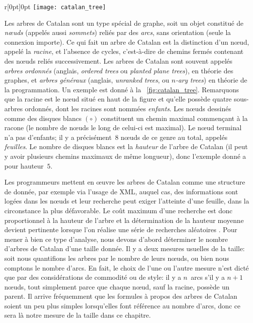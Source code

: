 %
\begin{wrapfigure}[9]{r}[0pt]{0pt}
\centering
\texttt{[image: catalan\_tree]}
\caption{Arbre de Catalan de hauteur~5}
\label{fig:catalan_tree}
\end{wrapfigure}
Les arbres de Catalan sont un type spécial de graphe, soit un objet
constitué de \emph{n{\oe}uds} (appelés aussi \emph{sommets}) reliés
par des \emph{arcs}, sans orientation (seule la connexion importe). Ce
qui fait un arbre de Catalan est la distinction d'un n{\oe}ud, appelé
la \emph{racine}, et l'absence de cycles, c'est-à-dire de chemins
fermés contenant des n{\oe}uds reliés successivement. Les arbres de
Catalan sont souvent appelés \emph{arbres ordonnés} (anglais,
\emph{ordered trees} ou \emph{planted plane trees}), en théorie des
graphes, et \emph{arbres généraux} (anglais, \emph{unranked trees}, ou
\emph{\(n\)-ary trees}) en théorie de la programmation. Un exemple est
donné à la \fig~\ref{fig:catalan_tree}. Remarquons que la racine est
le n{\oe}ud situé en haut de la figure et qu'elle possède quatre
sous-arbres ordonnés, dont les racines sont nommées
\emph{enfants}. Les n{\oe}uds dessinés comme des disques blancs
\((\circ)\) constituent un chemin maximal commençant à la racone (le
nombre de n{\oe}uds le long de celui-ci est maximal). Le n{\oe}ud
terminal n'a pas d'enfants; il y a précisément~\(8\) n{\oe}uds de ce
genre au total, appelés \emph{feuilles}. Le nombre de disques blancs
est la \emph{hauteur} de l'arbre de Catalan (il peut y avoir plusieurs
chemins maximaux de même longueur), donc l'exemple donné a pour
hauteur~\(5\).

Les programmeurs mettent en {\oe}uvre les arbres de Catalan comme une
structure de donnée, par exemple via l'usage de \textsf{XML}, auquel
cas, des informations sont logées dans les n{\oe}uds et leur recherche
peut exiger l'atteinte d'une feuille, dans la circonstance la plus
défavorable. Le coût maximum d'une recherche est donc proportionnel à
la hauteur de l'arbre et la détermination de la hauteur moyenne
devient pertinente lorsque l'on réalise une série de recherches
aléatoires \citep{VitterFlajolet_1990}. Pour mener à bien ce type
d'analyse, nous devons d'abord déterminer le nombre d'arbres de
Catalan d'une taille donnée. Il y a deux mesures usuelles de la
taille: soit nous quantifions les arbres par le nombre de leurs
n{\oe}uds, ou bien nous comptons le nombre d'arcs. En fait, le choix
de l'une ou l'autre mesure n'est dicté que par des considérations de commodité ou de style: il y a \(n\)~arcs s'il y a \(n+1\) n{\oe}uds, tout simplement parce que chaque n{\oe}ud, sauf la racine, possède un parent. Il arrive fréquemment que les formules à propos des arbres de Catalan soient un peu plus simples lorsqu'elles font référence au nombre d'arcs, donc ce sera là notre mesure de la taille dans ce chapitre.

